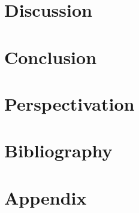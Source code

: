 \documentclass[a4paper,11pt]{article}
\begin{document}
\section{Discussion}

\section{Conclusion}

\section{Perspectivation}


\newpage
\section{Bibliography}



\newpage
\section{Appendix}




\newpage

\end{document}
